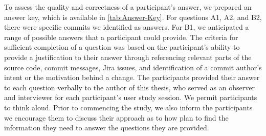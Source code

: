 To assess the quality and correctness of a participant's answer, 
we prepared an answer key, which is available in \autoref{tab:Answer-Key}.
For questions A1, A2, and B2, there were specific commits we identified as answers.
For B1, we anticipated a range of possible answers that a participant could provide.
The criteria for sufficient completion of a question was based on the participant's ability 
to provide a justification to their answer through referencing relevant parts of the source code, commit messages, Jira issues, and
identification of a commit author's intent or the motivation behind a change.
The participants provided their answer to each question verbally to the author of this thesis, 
who served as an observer and interviewer for each participant's user study session.
We permit participants to think aloud.
Prior to commencing the study, we also inform the participants we encourage them to discuss their approach 
as to how plan to find the information they need to answer the questions they are provided.

